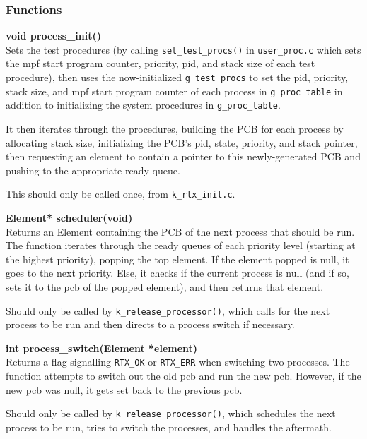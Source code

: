 \documentclass[11pt, oneside]{article}
\begin{document}
\subsubsection{Functions}
{\bf void process\_init()}\\
Sets the test procedures (by calling {\tt set\_test\_procs()} in {\tt user\_proc.c} which sets the mpf start program counter, priority, pid, and stack size of each test procedure), then uses the now-initialized {\tt g\_test\_procs} to set the pid, priority, stack size, and mpf start program counter of each process in {\tt g\_proc\_table} in addition to initializing the system procedures in {\tt g\_proc\_table}.

It then iterates through the procedures, building the PCB for each process by allocating stack size, initializing the PCB's pid, state, priority, and stack pointer, then requesting an element to contain a pointer to this newly-generated PCB and pushing to the appropriate ready queue.

This should only be called once, from {\tt k\_rtx\_init.c}.

{\bf Element* scheduler(void)}\\
Returns an Element containing the PCB of the next process that should be run. The function iterates through the ready queues of each priority level (starting at the highest priority), popping the top element. If the element popped is null, it goes to the next priority. Else, it checks if the current process is null (and if so, sets it to the pcb of the popped element), and then returns that element.

Should only be called by {\tt k\_release\_processor()}, which calls for the next process to be run and then directs to a process switch if necessary.

{\bf int process\_switch(Element *element)}\\
Returns a flag signalling {\tt RTX\_OK} or {\tt RTX\_ERR} when switching two processes. The function attempts to switch out the old pcb and run the new pcb. However, if the new pcb was null, it gets set back to the previous pcb.

Should only be called by {\tt k\_release\_processor()}, which schedules the next process to be run, tries to switch the processes, and handles the aftermath.
\end{document}
